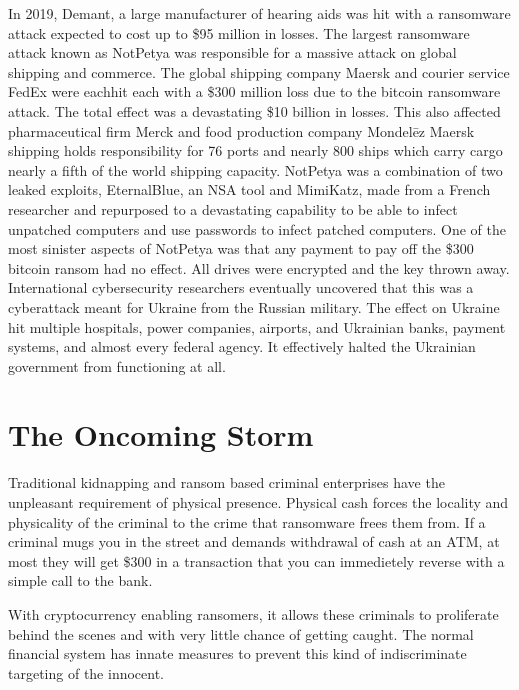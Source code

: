 
In 2019, Demant, a large manufacturer of hearing aids was hit with a ransomware
attack expected to cost up to \$95 million in losses.  The largest ransomware
attack known as NotPetya was responsible for a massive attack on global shipping
and commerce. The global shipping company Maersk and courier service FedEx were
eachhit each with a \$300 million loss due to the bitcoin ransomware attack.
The total effect was a devastating \$10 billion in losses. This also affected
pharmaceutical firm Merck and food production company Mondelēz Maersk shipping
holds responsibility for 76 ports and nearly 800 ships which carry cargo nearly
a fifth of the world shipping capacity.  NotPetya was a combination of two
leaked exploits, EternalBlue, an NSA tool and MimiKatz, made from a French
researcher and repurposed to a devastating capability to be able to infect
unpatched computers and use passwords to infect patched computers. One of the
most sinister aspects of NotPetya was that any payment to pay off the \$300
bitcoin ransom had no effect. All drives were encrypted and the key thrown away.
International cybersecurity researchers eventually uncovered that this was a
cyberattack meant for Ukraine from the Russian military. The effect on Ukraine
hit multiple hospitals, power companies, airports, and Ukrainian banks, payment
systems, and almost every federal agency. It effectively halted the Ukrainian
government from functioning at all.
\cite{mcquade2018untold}


\section{The Oncoming Storm}

Traditional kidnapping and ransom based criminal enterprises have the unpleasant
requirement of physical presence. Physical cash forces the locality and
physicality of the criminal to the crime that ransomware frees them from. If a
criminal mugs you in the street and demands withdrawal of cash at an ATM, at
most they will get \$300 in a transaction that you can immedietely reverse with
a simple call to the bank.

With cryptocurrency enabling ransomers, it allows these criminals to proliferate
behind the scenes and with very little chance of getting caught.  The normal
financial system has innate measures to prevent this kind of indiscriminate
targeting of the innocent.

